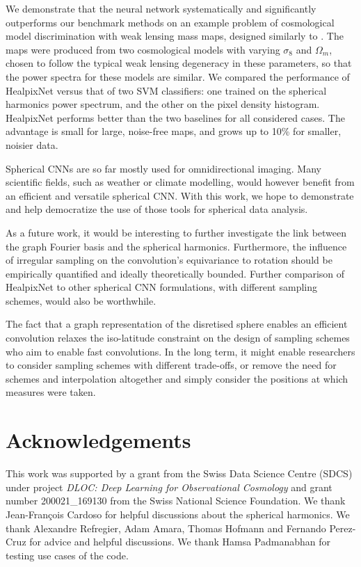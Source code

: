 \documentclass[final,twocolumn,3p,times,sort&compress]{elsarticle}
\newcommand{\1}{\b{1}}              %
\newcommand{\0}{\b{0}}              %
\begin{document}
We demonstrate that the neural network systematically and significantly outperforms our benchmark methods on an example problem of cosmological model discrimination with weak lensing mass maps, designed similarly to \citep{schmelze2017cosmologicalmodel}.
The maps were produced from two cosmological models with varying $\sigma_8$ and $\Omega_m$, chosen to follow the typical weak lensing degeneracy in these parameters, so that the power spectra for these models are similar.
We compared the performance of HealpixNet versus that of two SVM classifiers: one trained on the spherical harmonics power spectrum, and the other on the pixel density histogram.
HealpixNet performs better than the two baselines for all considered cases.
The advantage is small for large, noise-free maps, and grows up to 10\% for smaller, noisier data.

Spherical CNNs are so far mostly used for omnidirectional imaging.
Many scientific fields, such as weather or climate modelling, would however benefit from an efficient and versatile spherical CNN.
With this work, we hope to demonstrate and help democratize the use of those tools for spherical data analysis.

As a future work, it would be interesting to further investigate the link between the graph Fourier basis and the spherical harmonics.
Furthermore, the influence of irregular sampling on the convolution's equivariance to rotation should be empirically quantified and ideally theoretically bounded.
Further comparison of HealpixNet to other spherical CNN formulations, with different sampling schemes, would also be worthwhile.

The fact that a graph representation of the disretised sphere enables an efficient convolution relaxes the iso-latitude constraint on the design of sampling schemes who aim to enable fast convolutions.
In the long term, it might enable researchers to consider sampling schemes with different trade-offs, or remove the need for schemes and interpolation altogether and simply consider the positions at which measures were taken.

\section*{Acknowledgements}

This work was supported by a grant from the Swiss Data Science Centre (SDCS) under project \textit{DLOC:  Deep Learning for Observational Cosmology} and grant number 200021\_169130 from the Swiss National Science Foundation.
We thank Jean-François Cardoso for helpful discussions about the spherical harmonics.
We thank Alexandre Refregier, Adam Amara, Thomas Hofmann and Fernando Perez-Cruz for advice and helpful discussions.
We thank Hamsa Padmanabhan for testing use cases of the code.
\end{document}
